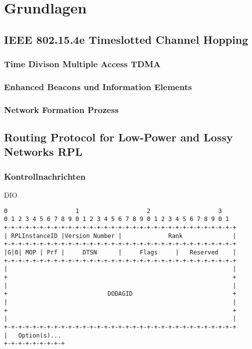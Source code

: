 \section{Grundlagen}
\label{sec:Grundlagen}
\subsection{IEEE 802.15.4e Timeslotted Channel Hopping}
\label{subsec:grundlagen_tsch}

\subsubsection{Time Divison Multiple Access TDMA}
\label{subsubsec:grundlagen_tdma}

\subsubsection{Enhanced Beacons und Information Elements}
\label{subsubsec:grundlagen_tsch_eb_ie}

\subsubsection{Network Formation Prozess}
\label{subsubsec:grundlagen_tsch_networkformation}
\subsection{Routing Protocol for Low-Power and Lossy Networks RPL}
\label{subsec:grundlagen_rpl}

\subsubsection{Kontrollnachrichten}
\label{subsubsection:grundlagen_rpl_kontrollnachrichten}

DIO

\begin{lstlisting}[frame=single]
0                   1                   2                   3
0 1 2 3 4 5 6 7 8 9 0 1 2 3 4 5 6 7 8 9 0 1 2 3 4 5 6 7 8 9 0 1
+-+-+-+-+-+-+-+-+-+-+-+-+-+-+-+-+-+-+-+-+-+-+-+-+-+-+-+-+-+-+-+-+
| RPLInstanceID |Version Number |             Rank              |
+-+-+-+-+-+-+-+-+-+-+-+-+-+-+-+-+-+-+-+-+-+-+-+-+-+-+-+-+-+-+-+-+
|G|0| MOP | Prf |     DTSN      |     Flags     |   Reserved    |
+-+-+-+-+-+-+-+-+-+-+-+-+-+-+-+-+-+-+-+-+-+-+-+-+-+-+-+-+-+-+-+-+
|                                                               |
+                                                               +
|                                                               |
+                            DODAGID                            +
|                                                               |
+                                                               +
|                                                               |
+-+-+-+-+-+-+-+-+-+-+-+-+-+-+-+-+-+-+-+-+-+-+-+-+-+-+-+-+-+-+-+-+
|   Option(s)...
+-+-+-+-+-+-+-+-+
\end{lstlisting}

